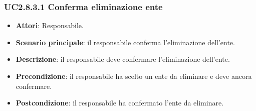\subsubsection{UC2.8.3.1 Conferma eliminazione ente}
\begin{itemize}
\item \textbf{Attori}: Responsabile.
\item \textbf{Scenario principale}: il responsabile conferma l'eliminazione dell'ente.
\item \textbf{Descrizione}: il responsabile deve confermare l'eliminazione dell'ente.
\item \textbf{Precondizione}: il responsabile ha scelto un ente da eliminare e deve ancora confermare.
\item \textbf{Postcondizione}: il responsabile ha confermato l'ente da eliminare.
\end{itemize}
